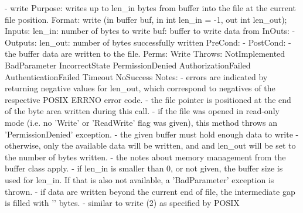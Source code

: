 \begin{myspec}
 
    - write
      Purpose:  writes up to len_in bytes from buffer into
                the file at the current file position.
      Format:   write              (in  buffer      buf,
                                    in  int         len_in = -1,
                                    out int         len_out);
      Inputs:   len_in:             number of bytes to write
                buf:                buffer to write data from
      InOuts:   -
      Outputs:  len_out:            number of bytes successfully
                                    written
      PreCond:  -
      PostCond: - the buffer data are written to the file.
      Perms:    Write
      Throws:   NotImplemented
                BadParameter
                IncorrectState
                PermissionDenied
                AuthorizationFailed
                AuthenticationFailed
                Timeout
                NoSuccess
      Notes:    - errors are indicated by returning negative
                  values for len_out, which correspond to
                  negatives of the respective POSIX ERRNO error 
                  code.
                - the file pointer is positioned at the end
                  of the byte area written during this call.
                - if the file was opened in read-only mode (i.e.
                  no 'Write' or 'ReadWrite' flag was given), this
                  method throws an 'PermissionDenied' exception.
                - the given buffer must hold enough data to
                  write - otherwise, only the available data
                  will be written, and and len_out will be set
                  to the number of bytes written.
                - the notes about memory management from the
                  buffer class apply.
                - if len_in is smaller than 0, or not given, 
                  the buffer size is used for len_in.
                  If that is also not available, a
                  'BadParameter' exception is thrown.
                - if data are written beyond the current end of
                  file, the intermediate gap is filled with '\0'
                  bytes.
                - similar to write (2) as specified by POSIX
 

\end{myspec}
